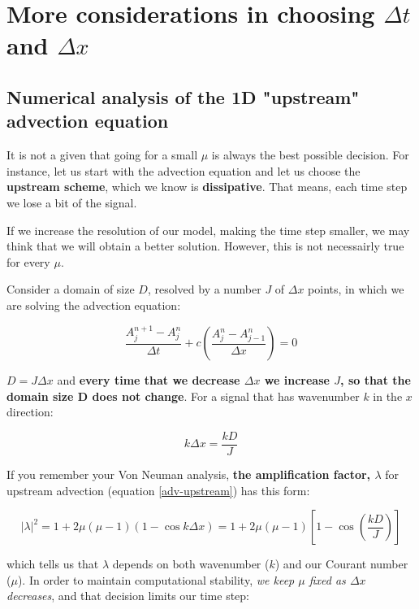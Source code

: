 \section{More considerations in choosing $\Delta t$ and $\Delta x $}
\subsection{Numerical analysis of the 1D "upstream" advection equation}

It is not a given that going for a small $\mu$ is always the best possible decision.
For instance, let us start with the advection equation and let us choose the \textbf{upstream scheme}, which we know is \textbf{dissipative}. That means, each time step we lose a bit of the signal.


If we increase the resolution of our model, making the time step smaller, we may think that we will obtain a better solution. However, this is not necessairly true for every $\mu$.

\medskip
Consider a domain of size $D$, resolved by a number $J$ of $\Delta x$ points, in which we are solving the advection equation:

\begin{equation}
	\frac {A_j^{n+1}-A_j^{n}}{\Delta t} +c \left(  \frac {A_j^{n}-A_{j-1}^{n}}{\Delta x}  \right) = 0
	\label{adv-upstream}
\end{equation}

$D=J \Delta x$ and {\bf every time that we decrease $\Delta x$ we increase $J$, so that the domain size D does not change}. For a signal that has wavenumber $k$ in the $x$ direction:

\begin{equation}
	k \Delta x = \frac {k D}{J}
\end{equation}

If you remember your Von Neuman analysis, \textbf{the amplification factor, $\lambda$} for upstream advection (equation \ref{adv-upstream})	has this form:

\begin{equation}
	|\lambda|^2 = 1+2\mu(\mu-1)(1-\cos k \Delta x) = 1+2\mu(\mu-1)[1-\cos ( \frac {k D} {J})]
\end{equation}

which tells us that $\lambda$ depends on both wavenumber ($k$) and our Courant number ($\mu$). 
In order to maintain computational stability, \emph{we keep $\mu$ fixed as $\Delta x$ decreases}, and that decision limits our time step:

